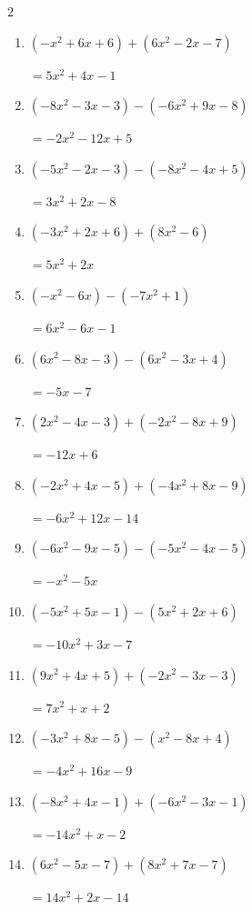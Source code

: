 \begin{multicols}{2}
\begin{enumerate}
  \item $(-x^{2}+6x+6)+(6x^{2}-2x-7)$

        $=5x^{2}+4x-1$

  \item $(-8x^{2}-3x-3)-(-6x^{2}+9x-8)$

        $=-2x^{2}-12x+5$

  \item $(-5x^{2}-2x-3)-(-8x^{2}-4x+5)$

        $=3x^{2}+2x-8$

  \item $(-3x^{2}+2x+6)+(8x^{2}-6)$

        $=5x^{2}+2x$

  \item $(-x^{2}-6x)-(-7x^{2}+1)$

        $=6x^{2}-6x-1$

\columnbreak %

  \item $(6x^{2}-8x-3)-(6x^{2}-3x+4)$

        $=-5x-7$

  \item $(2x^{2}-4x-3)+(-2x^{2}-8x+9)$

        $=-12x+6$

  \item $(-2x^{2}+4x-5)+(-4x^{2}+8x-9)$

        $=-6x^{2}+12x-14$

  \item $(-6x^{2}-9x-5)-(-5x^{2}-4x-5)$

        $=-x^{2}-5x$

  \item $(-5x^{2}+5x-1)-(5x^{2}+2x+6)$

        $=-10x^{2}+3x-7$

  \item $(9x^{2}+4x+5)+(-2x^{2}-3x-3)$

        $=7x^{2}+x+2$

  \item $(-3x^{2}+8x-5)-(x^{2}-8x+4)$

        $=-4x^{2}+16x-9$

  \item $(-8x^{2}+4x-1)+(-6x^{2}-3x-1)$

        $=-14x^{2}+x-2$

  \item $(6x^{2}-5x-7)+(8x^{2}+7x-7)$

        $=14x^{2}+2x-14$


\end{enumerate}
\end{multicols}
